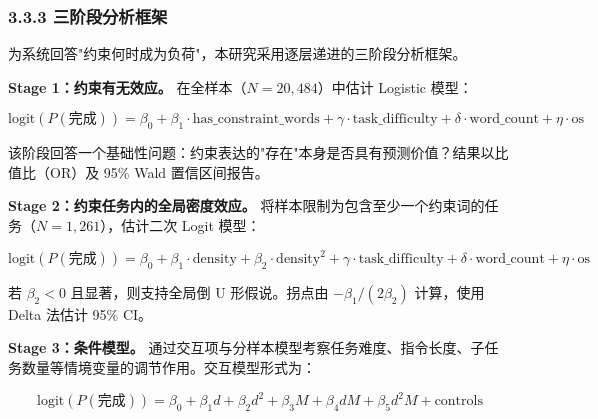 \documentclass[12pt,a4paper,openany,oneside]{ctexrep}
\begin{document}
\begin{table}[htbp]
\centering
\caption{表 6：约束表达的类型学定义与关键词}
\small
{}
\end{table}

\subsubsection{3.3.3 三阶段分析框架}


为系统回答"约束何时成为负荷"，本研究采用逐层递进的三阶段分析框架。

\textbf{Stage 1：约束有无效应。} 在全样本（$N=20{,}484$）中估计 Logistic 模型：

\[
\text{logit}(P(\text{完成})) = \beta_0 + \beta_1 \cdot \text{has\_constraint\_words} + \gamma \cdot \text{task\_difficulty} + \delta \cdot \text{word\_count} + \eta \cdot \text{os}
\]


该阶段回答一个基础性问题：约束表达的"存在"本身是否具有预测价值？结果以比值比（OR）及 95\% Wald 置信区间报告。

\textbf{Stage 2：约束任务内的全局密度效应。} 将样本限制为包含至少一个约束词的任务（$N=1{,}261$），估计二次 Logit 模型：

\[
\text{logit}(P(\text{完成})) = \beta_0 + \beta_1 \cdot \text{density} + \beta_2 \cdot \text{density}^2 + \gamma \cdot \text{task\_difficulty} + \delta \cdot \text{word\_count} + \eta \cdot \text{os}
\]


若 $\beta_2<0$ 且显著，则支持全局倒 U 形假说。拐点由 $-\beta_1/(2\beta_2)$ 计算，使用 Delta 法估计 95\% CI。

\textbf{Stage 3：条件模型。} 通过交互项与分样本模型考察任务难度、指令长度、子任务数量等情境变量的调节作用。交互模型形式为：

\[
\text{logit}(P(\text{完成})) = \beta_0 + \beta_1 d + \beta_2 d^2 + \beta_3 M + \beta_4 dM + \beta_5 d^2 M + \text{controls}
\]
\end{document}
